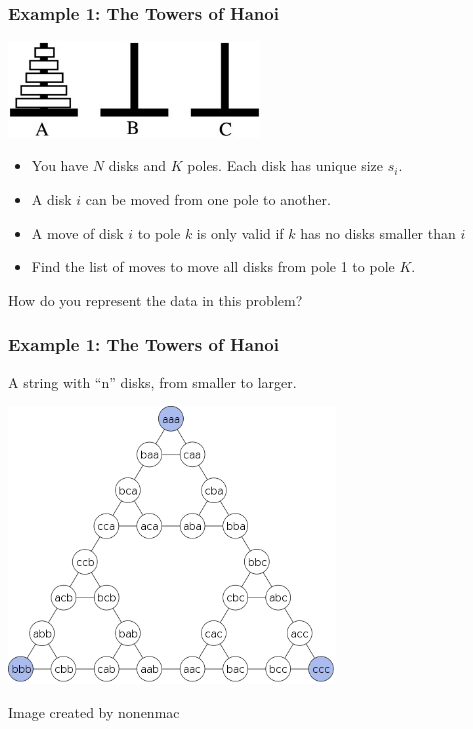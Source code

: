 \documentclass{beamer}
\begin{document}
\begin{frame}
  \frametitle{Example 1: The Towers of Hanoi}

  \begin{center}
    \includegraphics[width=0.5\textwidth]{img/hanoi}
  \end{center}
  \medskip

  {\small
    \begin{itemize}
    \item You have $N$ disks and $K$ poles. Each disk has unique size $s_i$.
    \item A disk $i$ can be moved from one pole to another.
    \item A move of disk $i$ to pole $k$ is only valid if $k$ has no disks smaller than $i$
    \item Find the list of moves to move all disks from pole 1 to pole $K$.
    \end{itemize}
  }

  \vfill

  How do you represent the data in this problem?
\end{frame}

\begin{frame}
  \frametitle{Example 1: The Towers of Hanoi}
  A string with ``n'' disks, from smaller to larger.
  \begin{center}
    \includegraphics[width=0.65\textwidth]{img/hanoi_graph}
  \end{center}
  {\tiny \hfill Image created by nonenmac}
\end{frame}
\end{document}

